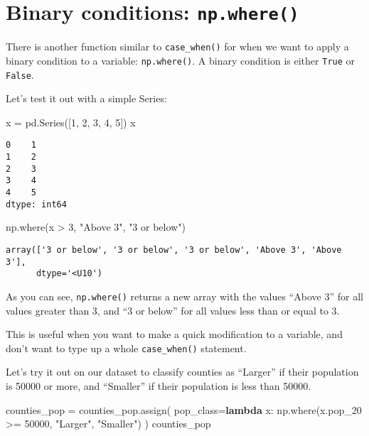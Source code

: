 \documentclass[
  letterpaper,
  DIV=11,
  numbers=noendperiod]{scrreprt}
\newenvironment{Shaded}{\begin{snugshade}}{\end{snugshade}}
\newcommand{\DecValTok}[1]{\textcolor[rgb]{0.68,0.00,0.00}{#1}}
\newcommand{\KeywordTok}[1]{\textcolor[rgb]{0.00,0.23,0.31}{\textbf{#1}}}
\newcommand{\NormalTok}[1]{\textcolor[rgb]{0.00,0.23,0.31}{#1}}
\newcommand{\OperatorTok}[1]{\textcolor[rgb]{0.37,0.37,0.37}{#1}}
\newcommand{\StringTok}[1]{\textcolor[rgb]{0.13,0.47,0.30}{#1}}
\begin{document}
\section{\texorpdfstring{Binary conditions:
\texttt{np.where()}}{Binary conditions: np.where()}}\label{binary-conditions-np.where}

There is another function similar to \texttt{case\_when()} for when we
want to apply a binary condition to a variable: \texttt{np.where()}. A
binary condition is either \texttt{True} or \texttt{False}.

Let's test it out with a simple Series:

\begin{Shaded}
\begin{Highlighting}[]
\NormalTok{x }\OperatorTok{=}\NormalTok{ pd.Series([}\DecValTok{1}\NormalTok{, }\DecValTok{2}\NormalTok{, }\DecValTok{3}\NormalTok{, }\DecValTok{4}\NormalTok{, }\DecValTok{5}\NormalTok{])}
\NormalTok{x}
\end{Highlighting}
\end{Shaded}

\begin{verbatim}
0    1
1    2
2    3
3    4
4    5
dtype: int64
\end{verbatim}

\begin{Shaded}
\begin{Highlighting}[]
\NormalTok{np.where(x }\OperatorTok{\textgreater{}} \DecValTok{3}\NormalTok{, }\StringTok{"Above 3"}\NormalTok{, }\StringTok{"3 or below"}\NormalTok{)}
\end{Highlighting}
\end{Shaded}

\begin{verbatim}
array(['3 or below', '3 or below', '3 or below', 'Above 3', 'Above 3'],
      dtype='<U10')
\end{verbatim}

As you can see, \texttt{np.where()} returns a new array with the values
``Above 3'' for all values greater than 3, and ``3 or below'' for all
values less than or equal to 3.

This is useful when you want to make a quick modification to a variable,
and don't want to type up a whole \texttt{case\_when()} statement.

Let's try it out on our dataset to classify counties as ``Larger'' if
their population is 50000 or more, and ``Smaller'' if their population
is less than 50000.

\begin{Shaded}
\begin{Highlighting}[]
\NormalTok{counties\_pop }\OperatorTok{=}\NormalTok{ counties\_pop.assign(}
\NormalTok{    pop\_class}\OperatorTok{=}\KeywordTok{lambda}\NormalTok{ x: np.where(x.pop\_20 }\OperatorTok{\textgreater{}=} \DecValTok{50000}\NormalTok{, }\StringTok{"Larger"}\NormalTok{, }\StringTok{"Smaller"}\NormalTok{)}
\NormalTok{)}
\NormalTok{counties\_pop}
\end{Highlighting}
\end{Shaded}
\end{document}
